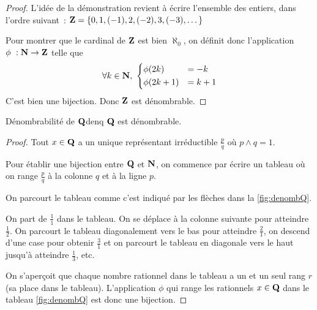 \documentclass[a4paper,french,final]{memoir}
\begin{document}
\begin{proof}
L'idée de la démonstration revient à écrire l'ensemble des entiers, dans l'ordre suivant~:  $\mathbf{Z}=\left\lbrace 0,1,(-1),2,(-2),3,(-3),\dots\right\rbrace$

	Pour montrer que le cardinal de $\mathbf{Z}$ est bien $\aleph_0$, on définit donc l'application $\phi~: \NN \to \ZZ$ telle que \[ \forall k \in \NN, \
	\begin{dcases}
	\phi(2k)& = -k \\
	\phi(2k + 1)& = k+1
	\end{dcases}
\]
	C'est bien une bijection. Donc $\mathbf{Z}$ est dénombrable.
\end{proof}
\begin{theoremb}{Dénombrabilité de $\mathbf{Q}$}{denq}
	$\mathbf{Q}$ est dénombrable.
\end{theoremb}
\begin{proof}
	Tout $x \in \mathbf{Q}$ a un unique représentant irréductible $\frac{p}{q}$ où $p \wedge q = 1$.

	Pour établir une bijection entre $\mathbf{Q}$ et $\mathbf{N}$, on commence par écrire un tableau où on range $\frac{p}{q}$ à la colonne $q$ et à la ligne $p$.

	On parcourt le tableau comme c'est indiqué par les flèches dans la \cref{fig:denombQ}.

	\noindent On part de $\frac{1}{1}$ dans le tableau. On se déplace à la colonne suivante pour atteindre $\frac{1}{2}$. On parcourt le tableau diagonalement vers le bas pour atteindre $\frac{2}{1}$, on descend d'une case pour obtenir $\frac{3}{1}$ et on parcourt le tableau en diagonale vers le haut jusqu'à atteindre $\frac{1}{3}$, etc.

	On s'aperçoit que chaque nombre rationnel dans le tableau a un et un seul rang $r$ (sa place dans le tableau). L'application $\phi$ qui range les rationnels $x \in \mathbf{Q}$ dans le tableau \cref{fig:denombQ} est donc une bijection.
\end{proof}
\end{document}
